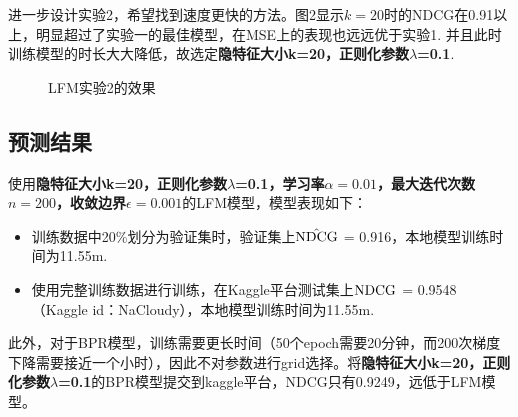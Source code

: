 \documentclass[12pt, a4paper]{ctexart}
\begin{document}
进一步设计实验2，希望找到速度更快的方法。图2显示$k=20$时的NDCG在0.91以上，明显超过了实验一的最佳模型，在MSE上的表现也远远优于实验1. 并且此时训练模型的时长大大降低，故选定\textbf{隐特征大小k=20，正则化参数$\lambda$=0.1}.


\begin{figure}[H] %
    \centering  %
    \vspace{-0.35cm} %
    \subfigtopskip=2pt %
    \subfigbottomskip=2pt %
    \subfigcapskip=-5pt %
    \quad %
    \quad
    \caption{LFM实验2的效果}
    \label{level2}
 \end{figure}



\subsection{预测结果}

使用\textbf{隐特征大小k=20，正则化参数$\lambda$=0.1，学习率$\alpha=0.01$，最大迭代次数$n=200$，收敛边界$\epsilon=0.001$}的LFM模型，模型表现如下：
\begin{itemize}
    \item 训练数据中20\%划分为验证集时，验证集上$\hat{\rm{NDCG}}$ = 0.916，本地模型训练时间为11.55m.
    \item 使用完整训练数据进行训练，在Kaggle平台测试集上$\rm{NDCG}$ = 0.9548（Kaggle id：NaCloudy），本地模型训练时间为11.55m.
\end{itemize}

此外，对于BPR模型，训练需要更长时间（50个epoch需要20分钟，而200次梯度下降需要接近一个小时），因此不对参数进行grid选择。将\textbf{隐特征大小k=20，正则化参数$\lambda$=0.1}的BPR模型提交到kaggle平台，NDCG只有0.9249，远低于LFM模型。
\end{document}

